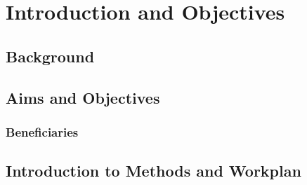 

\chapter{Introduction and Objectives}
\label{Intro} 
\lipsum[1]


\section{Background}
\lipsum[1]


\section{Aims and Objectives}
\lipsum[1]



\subsection{Beneficiaries}
\lipsum[1]


\section{Introduction to Methods and Workplan}
\lipsum[1]

